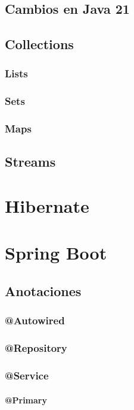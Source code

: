 \documentclass[12pt,article,oneside]{memoir}
\begin{document}
		\section{Cambios en Java 21}
		\newpage
		
		\section{Collections}
			\subsection{Lists}
			\newpage
			\subsection{Sets}
			\newpage
			\subsection{Maps}
		\newpage
		
		\section{Streams}
		\newpage
	
	\chapter{Hibernate}
	\newpage

	\chapter{Spring Boot}
		\section{Anotaciones}
			\subsection{@Autowired}
			\subsection{@Repository}
			\subsection{@Service}
				\subsubsection{@Primary}
\end{document}
